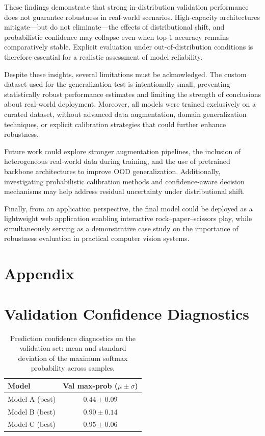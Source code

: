 \documentclass{article}
\begin{document}
These findings demonstrate that strong in-distribution validation
performance does not guarantee robustness in real-world scenarios.
High-capacity architectures mitigate—but do not eliminate—the effects of
distributional shift, and probabilistic confidence may collapse even when
top-1 accuracy remains comparatively stable. Explicit evaluation under
out-of-distribution conditions is therefore essential for a realistic
assessment of model reliability.

Despite these insights, several limitations must be acknowledged.
The custom dataset used for the generalization test is intentionally small,
preventing statistically robust performance estimates and limiting the
strength of conclusions about real-world deployment.
Moreover, all models were trained exclusively on a curated dataset,
without advanced data augmentation, domain generalization techniques,
or explicit calibration strategies that could further enhance robustness.

Future work could explore stronger augmentation pipelines, the inclusion
of heterogeneous real-world data during training, and the use of
pretrained backbone architectures to improve OOD generalization.
Additionally, investigating probabilistic calibration methods and
confidence-aware decision mechanisms may help address residual
uncertainty under distributional shift.

Finally, from an application perspective, the final model could be deployed
as a lightweight web application enabling interactive rock--paper--scissors
play, while simultaneously serving as a demonstrative case study on the
importance of robustness evaluation in practical computer vision systems.

\newpage
\appendix
\section*{Appendix}


\section{Validation Confidence Diagnostics}
\label{app:confidence}

\begin{table}[h]
\centering
\caption{Prediction confidence diagnostics on the validation set: 
mean and standard deviation of the maximum softmax probability across samples.}
\begin{tabular}{lc}
\hline
Model & Val max-prob ($\mu \pm \sigma$) \\
\hline
Model A (best) & $0.44 \pm 0.09$ \\
Model B (best) & $0.90 \pm 0.14$ \\
Model C (best) & $0.95 \pm 0.06$ \\
\hline
\end{tabular}
\end{table}
\end{document}
